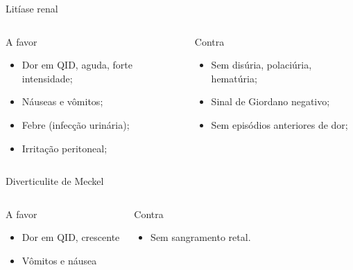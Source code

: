 \begin{frame}{Litíase renal}
    \begin{columns}
        \begin{block}{A favor}
            \begin{itemize}
            \item Dor em QID, aguda, forte intensidade;
            \item Náuseas e vômitos;
            \item Febre (infecção urinária);
            \item Irritação peritoneal;
            \end{itemize}
        \end{block}
     
        \begin{block}{Contra}
            \begin{itemize}
             \item Sem disúria, polaciúria, hematúria;
            \item Sinal de Giordano negativo;
            \item Sem episódios anteriores de dor;
            \end{itemize}
        \end{block}
    \end{columns}
\end{frame}


\begin{frame}{Diverticulite de Meckel}
    \begin{columns}
        \begin{block}{A favor}
            \begin{itemize}
                \item Dor em QID, crescente
                \item Vômitos e náusea
            \end{itemize}
        \end{block}
     
        \begin{block}{Contra}
            \begin{itemize}
                \item Sem sangramento retal.
            \end{itemize}
        \end{block}
    \end{columns}
\end{frame}


